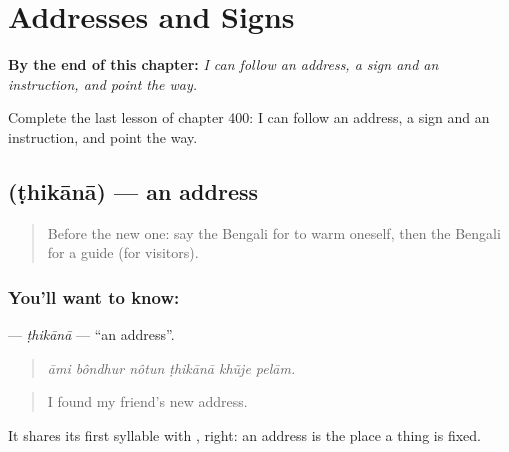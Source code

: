 
\chapter{Addresses and Signs}
\label{ch:bn-addresses-and-signs}

\begin{chapteropening}
\textbf{By the end of this chapter:} \emph{I can follow an address, a sign and an instruction, and point the way.}

Complete the last lesson of chapter 400: I can follow an address, a sign and an instruction, and point the way.
\end{chapteropening}

\section[\texorpdfstring{\bn{ঠিকানা} (ṭhikānā)}{ঠিকানা (ṭhikānā)}]{ (ṭhikānā) — an address}

\label{lesson:BN-C400-thikana}



\begin{quote}
Before the new one: say the Bengali for to warm oneself, then the Bengali for a guide (for visitors).
\end{quote}

\subsection*{You'll want to know: }
\textbf{} — \emph{ṭhikānā} — \textquotedblleft{}an address\textquotedblright{}.

\begin{quote}
     
\end{quote}

\begin{quote}
\emph{āmi bôndhur nôtun ṭhikānā khũje pelām.}
\end{quote}

\begin{quote}
I found my friend's new address.
\end{quote}

It shares its first syllable with , right: an address is the place a thing is fixed.

